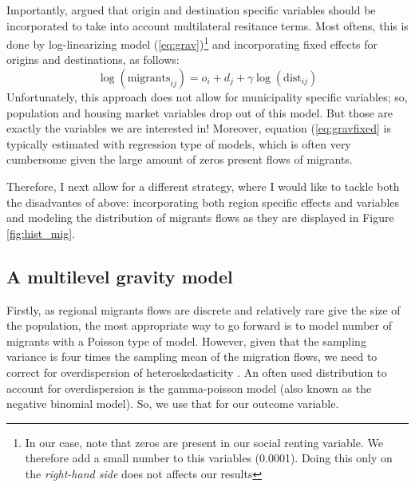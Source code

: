 \documentclass[fleqn,10pt]{SelfArx} %
\begin{document}
        Importantly, \citet{anderson2003gravity} argued that origin
        and destination specific variables should be incorporated to
        take into account multilateral resitance terms. Most oftens,
        this is done by log-linearizing model
        (\ref{eq:grav})\footnote{In our case, note that zeros are
          present in our social renting variable. We therefore add a
          small number to this variables (0.0001). Doing this only on
          the \emph{right-hand side} does not affects our results} and
        incorporating fixed effects for origins and destinations, as
        follows:
        \begin{equation}
          \log(\text{migrants}_{ij}) = o_i + d_j +  \gamma\log(\text{dist}_{ij})
          \label{eq:gravfixed}
        \end{equation} 
        Unfortunately, this approach does not allow for municipality
        specific variables; so, population and housing market
        variables drop out of this model. But those are exactly the
        variables we are interested in! Moreover, equation
        (\ref{eq:gravfixed} is typically estimated with regression
        type of models, which is often very cumbersome given the large
        amount of zeros present flows of migrants.

        Therefore, I next allow for a different strategy, where I
        would like to tackle both the disadvantes of above:
        incorporating both region specific effects and variables and
        modeling the distribution of migrants flows as they are
        displayed in Figure \ref{fig:hist_mig}.

        \subsection{A multilevel gravity model}

        Firstly, as regional migrants flows are discrete and
        relatively rare give the size of the population, the most
        appropriate way to go forward is to model number of migrants
        with a Poisson type of model. However, given that the sampling
        variance is four times the sampling mean of the migration
        flows, we need to correct for overdispersion of
        heteroskedasticity \citep[][states that heteroskedasticity
        (rather than the presence of too many zeros) is responsible
        for the main differences.]{silva2006log}. An often used
        distribution to account for overdispersion is the
        gamma-poisson model (also known as the negative binomial
        model). So, we use that for our outcome variable. 
\end{document}

